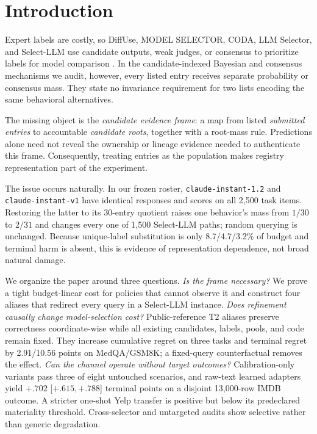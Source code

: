 \section{Introduction}
\label{sec:introduction}



Expert labels are costly, so DiffUse, MODEL SELECTOR, CODA, LLM Selector, and Select-LLM use candidate outputs, weak judges, or consensus to prioritize labels for model comparison \citep{ashurytahan2024diffuse,okanovic2025modelselector,kay2025coda,durmazkeser2025llmselector,durmazkeser2026selectllm}. In the candidate-indexed Bayesian and consensus mechanisms we audit, however, every listed entry receives separate probability or consensus mass. They state no invariance requirement for two lists encoding the same behavioral alternatives.

The missing object is the \emph{candidate evidence frame}: a map from listed \emph{submitted entries} to accountable \emph{candidate roots}, together with a root-mass rule. Predictions alone need not reveal the ownership or lineage evidence needed to authenticate this frame. Consequently, treating entries as the population makes registry representation part of the experiment.

The issue occurs naturally. In our frozen roster, \texttt{claude-instant-1.2} and \texttt{claude-instant-v1} have identical responses and scores on all 2,500 task items. Restoring the latter to its 30-entry quotient raises one behavior's mass from $1/30$ to $2/31$ and changes every one of 1,500 Select-LLM paths; random querying is unchanged. Because unique-label substitution is only 8.7/4.7/3.2\% of budget and terminal harm is absent, this is evidence of representation dependence, not broad natural damage.

We organize the paper around three questions. \emph{Is the frame necessary?} We prove a tight budget-linear cost for policies that cannot observe it and construct four aliases that redirect every query in a Select-LLM instance. \emph{Does refinement causally change model-selection cost?} Public-reference T2 aliases preserve correctness coordinate-wise while all existing candidates, labels, pools, and code remain fixed. They increase cumulative regret on three tasks and terminal regret by 2.91/10.56 points on MedQA/GSM8K; a fixed-query counterfactual removes the effect. \emph{Can the channel operate without target outcomes?} Calibration-only variants pass three of eight untouched scenarios, and raw-text learned adapters yield $+.702$ [$+.615,+.788$] terminal points on a disjoint 13,000-row IMDB outcome. A stricter one-shot Yelp transfer is positive but below its predeclared materiality threshold. Cross-selector and untargeted audits show selective rather than generic degradation.

